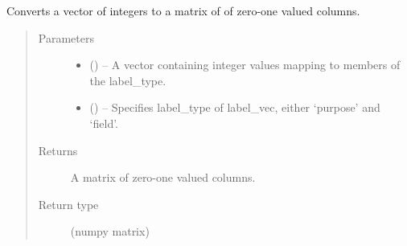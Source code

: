 \documentclass[letterpaper,10pt,english]{sphinxmanual}
\begin{document}

\begin{fulllineitems}
\label{\detokenize{KUHERD:KUHERD.LabelTransformations.vec2mat}}
Converts a vector of integers to a matrix of of zero-one valued columns.
\begin{quote}\begin{description}
\item[{Parameters}] \leavevmode\begin{itemize}
\item {} 
 () -- A vector containing integer values mapping to members of the label\_type.

\item {} 
 () -- Specifies label\_type of label\_vec, either `purpose' and `field'.

\end{itemize}

\item[{Returns}] \leavevmode
A matrix of zero-one valued columns.

\item[{Return type}] \leavevmode
(numpy matrix)

\end{description}\end{quote}

\end{fulllineitems}

\end{document}
